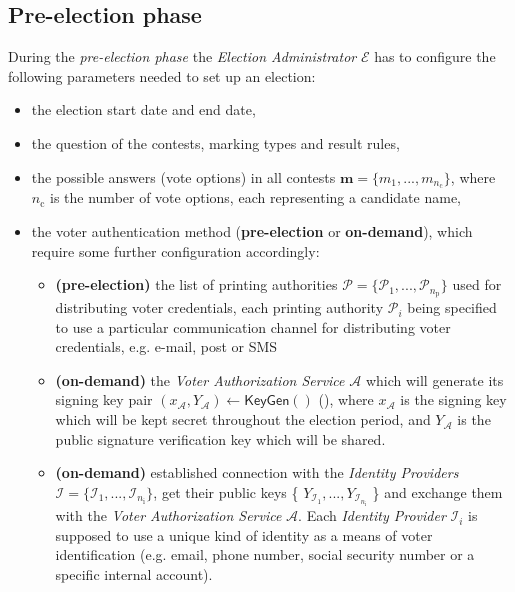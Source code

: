 \subsection{Pre-election phase} \label{sec: pre-election phase}
During the \textit{pre-election phase} the \textit{Election Administrator} $\mathcal{E}$ has to configure the following parameters needed to set up an election:
\begin{itemize}
    \item the election start date and end date,
    \item the question of the contests, marking types and result rules,
    \item the possible answers (vote options) in all contests \( \boldsymbol{m} = \{m_1, ..., m_{n_\mathrm{c}}\} \), where $n_\mathrm{c}$ is the number of vote options, each representing a candidate name,
    \item the voter authentication method (\textbf{pre-election} or \textbf{on-demand}), which require some further configuration accordingly:
    \begin{itemize}
        \item \textbf{(pre-election)} the list of printing authorities \( \boldsymbol{\mathcal{P}} = \{\mathcal{P}_1, ..., \mathcal{P}_{n_\mathrm{p}}\} \) used for distributing voter credentials, each printing authority $\mathcal{P}_i$ being specified to use a particular communication channel for distributing voter credentials, e.g. e-mail, post or SMS
        \item \textbf{(on-demand)} the \textit{Voter Authorization Service} $\mathcal{A}$ which will generate its signing key pair \( (x_\mathcal{A}, Y_\mathcal{A}) \leftarrow \mathsf{KeyGen}() \) (), where $x_\mathcal{A}$ is the signing key which will be kept secret throughout the election period, and $Y_\mathcal{A}$ is the public signature verification key which will be shared.
        \item \textbf{(on-demand)} established connection with the \textit{Identity Providers} $\boldsymbol{\mathcal{I}} = \{ \mathcal{I}_1, ..., \mathcal{I}_{n_\mathrm{i}}\}$, get their public keys \{ \( Y_{\mathcal{I}_1}, ..., Y_{\mathcal{I}_{n_\mathrm{i}}} \) \} and exchange them with the \textit{Voter Authorization Service} $\mathcal{A}$. Each \textit{Identity Provider} $\mathcal{I}_i$ is supposed to use a unique kind of identity as a means of voter identification (e.g. email, phone number, social security number or a specific internal account). 
    \end{itemize}

\end{itemize}
